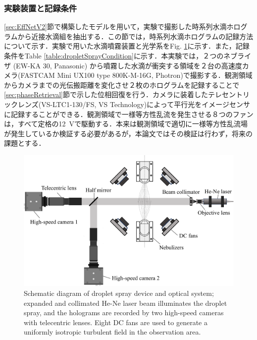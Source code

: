\subsubsection{実験装置と記録条件}
\ref{sec:EffNetV2}節で構築したモデルを用いて，実験で撮影した時系列水滴ホログラムから近接水滴組を抽出する．この節では，時系列水滴ホログラムの記録方法について示す．実験で用いた水滴噴霧装置と光学系をFig. \ref{fig:dropletSpray}に示す．また，記録条件をTable \ref{table:dropletSprayCondition}に示す．本実験では，２つのネブライザ (EW-KA 30, Panasonic) から噴霧した水滴が衝突する領域を２台の高速度カメラ(FASTCAM Mini UX100 type 800K-M-16G, Photron)で撮影する．観測領域からカメラまでの光伝搬距離を変化させ２枚のホログラムを記録することで\ref{sec:phaseRetrieval}節で示した位相回復を行う．カメラに装着したテレセントリックレンズ(VS-LTC1-130/FS, VS Technology)によって平行光をイメージセンサに記録することができる．観測領域で一様等方性乱流を発生させる８つのファンは，すべて定格の\SI{12}{\V}で駆動する．本来は観測領域で適切に一様等方性乱流場が発生しているか検証する必要があるが，本論文ではその検証は行わず，将来の課題とする．

\begin{figure}[H]
    \centering
    \includegraphics[width=0.8\linewidth]{./Figure/3_Methods/dropletspraysystem.pdf}
    \caption{Schematic diagram of droplet spray device and optical system; expanded and collimated He-Ne laser beam illuminates the droplet spray, and the holograms are recorded by two high-speed cameras with telecentric lenses. Eight DC fans are used to generate a uniformly isotropic turbulent field in the observation area.}
    \label{fig:dropletSpray}
\end{figure}

